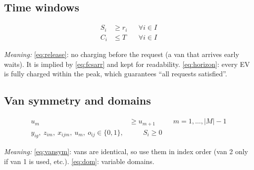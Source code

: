 \documentclass[12pt,a4paper]{article}
\newcommand{\mdesc}[1]{\par{\textit{Meaning:} #1}\par}
\begin{document}
\subsection{Time windows}
\begin{align}
S_i &\ge r_i && \forall i\in I \label{eq:release}\\
C_i &\le T && \forall i\in I \label{eq:horizon}
\end{align}
\mdesc{\eqref{eq:release}: no charging before the request (a van that arrives early waits). It is implied by \eqref{eq:fcsarr} and kept for readability. \eqref{eq:horizon}: every EV is fully charged within the peak, which guarantees ``all requests satisfied''.}

\subsection{Van symmetry and domains}
\begin{align}
u_m &\ge u_{m+1} && m=1,\dots,|M|-1 \label{eq:vansym}\\
y_{ig},\ z_{im},\ x_{ijm},\ u_m,\ o_{ij}\in\{0,1\}, & \qquad S_i\ge0 \label{eq:dom}
\end{align}
\mdesc{\eqref{eq:vansym}: vans are identical, so use them in index order (van 2 only if van 1 is used, etc.). \eqref{eq:dom}: variable domains.}
\end{document}
